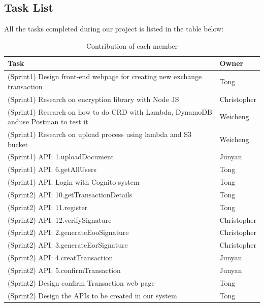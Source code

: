 \documentclass[runningheads]{llncs}
\begin{document}
\subsection{Task List}
All the tasks completed during our project is listed in the table below: 
	\begin{table}[H] %
    	\centering
    	\caption{Contribution of each member}
    	\label{table:Contribution} 
    	\begin{threeparttable}
    		\begin{tabular} {p{7cm}|p{2.5cm}<{\centering}}
    		\toprule
      		Task & Owner  \\
      		\midrule
        	(Sprint1) Design front-end webpage for creating new exchange transaction & Tong\\
        	\hline
        	(Sprint1) Research on encryption library with Node JS & Christopher\\
        	\hline
        	(Sprint1) Research on how to do CRD with Lambda, DynamoDB anduse Postman to test it & Weicheng\\
        	\hline
        	(Sprint1) Research on upload process using lambda and S3 bucket & Weicheng\\
        	\hline
        	(Sprint1) API: 1.uploadDocument & Junyan\\
        	\hline
        	(Sprint1) API: 6.getAllUsers & Tong\\
        	\hline
        	(Sprint1) API: Login with Cognito system & Tong\\
        	\hline
        	(Sprint2) API: 10.getTransactionDetails & Tong\\
        	\hline
        	(Sprint2) API: 11.register & Tong\\
        	\hline
        	(Sprint2) API: 12.verifySignature & Christopher\\
        	\hline
        	(Sprint2) API: 2.generateEooSignature & Christopher\\
        	\hline
        	(Sprint2) API: 3.generateEorSignature & Christopher\\
        	\hline
        	(Sprint2) API: 4.creatTransaction & Junyan\\
        	\hline
        	(Sprint2) API: 5.confirmTransaction & Junyan\\
        	\hline
        	(Sprint2) Design confirm Transaction web page & Tong\\
        	\hline
        	(Sprint2) Design the APIs to be created in our system & Tong\\

\end{tabular}
\end{threeparttable}
\end{table}
\end{document}
